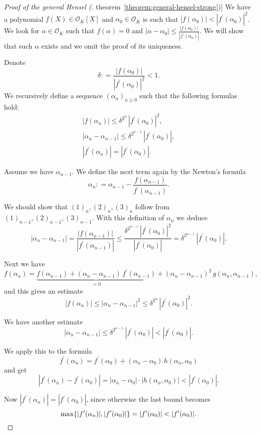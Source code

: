 \documentclass{article}
\newcommand{\dfn}{\mathrel{\mathop:}=}
\newcommand{\refref}[2]{\hyperref[#2]{#1~\ref*{#2}}}
\theoremstyle{myplain}
\theoremstyle{mydefinition}
\begin{document}
\begin{proof}[Proof of the general Hensel (\refref{theorem}{theorem:general-hensel-strong})]
  We have a polynomial $f (X) \in \mathcal{O}_K [X]$ and $\alpha_0 \in \mathcal{O}_K$ is such that
  $|f (\alpha_0)| < |f^\prime (\alpha_0)|^2$. We look for $\alpha \in \mathcal{O}_K$ such
  that $f (\alpha) = 0$ and
  $|\alpha - \alpha_0| \le \frac{|f(\alpha_0)|}{|f^\prime (\alpha_0)|}$. We will
  show that such $\alpha$ exists and we omit the proof of its uniqueness.

  Denote
  $$\delta \dfn \frac{|f (\alpha_0)|}{|f^\prime (\alpha_0)|^2} < 1.$$
  We recursively define a sequence $(\alpha_n)_{n \ge 0}$ such that the
  following formulas hold:
  \begin{gather*}
    \tag*{$(1)_n$} |f (\alpha_n)| \le \delta^{2^n} \, |f^\prime (\alpha_0)|^2,\\
    \tag*{$(2)_n$} |\alpha_n - \alpha_{n-1}| \le \delta^{2^{n-1}} \, |f^\prime (\alpha_0)|,\\
    \tag*{$(3)_n$} |f^\prime (\alpha_n)| = |f^\prime (\alpha_0)|.
  \end{gather*}

  Assume we have $\alpha_{n-1}$. We define the next term again by the Newton's
  formula
  $$\alpha_n \dfn \alpha_{n-1} - \frac{f (\alpha_{n-1})}{f^\prime (\alpha_{n-1})}.$$

  We should show that $(1)_n,(2)_n,(3)_n$ follow from
  $(1)_{n-1},(2)_{n-1},(3)_{n-1}$. With this definition of $\alpha_n$ we deduce
  \[ |\alpha_n - \alpha_{n-1}| =
    \frac{|f (\alpha_{n-1})|}{|f^\prime (\alpha_{n-1})|} \le
    \frac{\delta^{2^{n-1}}\,|f^\prime (\alpha_0)|^2}{|f^\prime (\alpha_0)|} =
    \delta^{2^{n-1}} \, |f^\prime (\alpha_0)|. \]

  Next we have
  \[ f (\alpha_n) = \underbrace{f (\alpha_{n-1}) + (\alpha_n - \alpha_{n-1}) \, f^\prime (\alpha_{n-1})}_{=0} +
    (\alpha_n - \alpha_{n-1})^2 \, g (\alpha_n,\alpha_{n-1}), \]
  and this gives an estimate
  $$|f (\alpha_n)| \le |\alpha_n - \alpha_{n-1}|^2 \le \delta^{2^n} \, |f^\prime (\alpha_0)|^2.$$

  We have another estimate
  $$|\alpha_n - \alpha_{n-1}| \le \delta^{2^{n-1}}\,|f^\prime (\alpha_0)| < |f^\prime (\alpha_0)|.$$

  We apply this to the formula
  $$f^\prime (\alpha_n) = f^\prime (\alpha_0) + (\alpha_n - \alpha_0) \, h (\alpha_n,\alpha_0)$$
  and get
  $$|f^\prime (\alpha_n) - f^\prime (\alpha_0)| =
  |\alpha_n - \alpha_0| \cdot |h (\alpha_n,\alpha_0)| < |f^\prime (\alpha_0)|.$$

  Now $|f^\prime (\alpha_n)| = |f^\prime (\alpha_0)|$, since otherwise the last
  bound becomes
  \[ \max \{ |f^\prime (\alpha_n)|, |f^\prime (\alpha_0)| \} =
    |f^\prime (\alpha_0)| < |f^\prime (\alpha_0)|. \qedhere \]
\end{proof}
\end{document}
